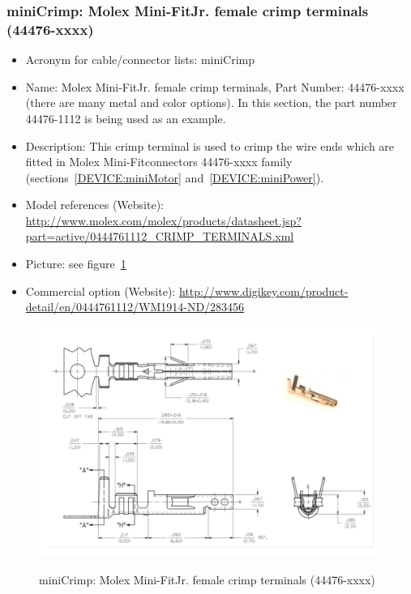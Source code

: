 \subsubsection{miniCrimp: Molex Mini-Fit\textregistered Jr. female crimp terminals (44476-xxxx)} \label{DEVICE:miniCrimp}
\begin{itemize}
  \item Acronym for cable/connector lists: miniCrimp
  \item Name: Molex Mini-Fit\textregistered Jr. female crimp terminals, Part Number: 44476-xxxx (there are many metal and color options). In this section, the part number 44476-1112 is being used as an example.
  \item Description: This crimp terminal is used to crimp the wire ends which are fitted in Molex Mini-Fit\textregistered connectors 44476-xxxx family (sections~\ref{DEVICE:miniMotor} and~\ref{DEVICE:miniPower}).
  \item Model references (Website): \href{http://www.molex.com/molex/products/datasheet.jsp?part=active/0444761112\_CRIMP\_TERMINALS.xml}{http://www.molex.com/molex/products/datasheet.jsp?part=active/0444761112\_CRIMP\_TERMINALS.xml}
  \item Picture: see figure~\ref{FIG:DEVICEminiCrimp}
  \item Commercial option (Website): \href{http://www.digikey.com/product-detail/en/0444761112/WM1914-ND/283456}{http://www.digikey.com/product-detail/en/0444761112/WM1914-ND/283456}
\end{itemize}
\begin{figure}
  \centering
  \includegraphics[angle=90,width=1\columnwidth]{figs/body02/FIGDEVICEminiCrimp.pdf}\\
  \caption[miniCrimp: Molex Mini-Fit\textregistered Jr. female crimp terminals (44476-xxxx)]{miniCrimp: Molex Mini-Fit\textregistered Jr. female crimp terminals (44476-xxxx)}
  \label{FIG:DEVICEminiCrimp}
\end{figure}